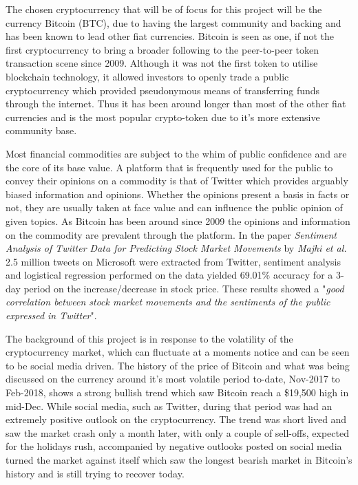 \documentclass[oneside, 12pt]{article}
\begin{document}
	The chosen cryptocurrency that will be of focus for this project will be the currency Bitcoin (BTC), due to having the largest community and backing and has been known to lead other fiat currencies. Bitcoin is seen as one, if not the first cryptocurrency to bring a broader following to the peer-to-peer token transaction scene since 2009. Although it was not the first token to utilise blockchain technology, it allowed investors to openly trade a public cryptocurrency which provided pseudonymous means of transferring funds through the internet. Thus it has been around longer than most of the other fiat currencies and is the most popular crypto-token due to it's more extensive community base.
	
	Most financial commodities are subject to the whim of public confidence and are the core of its base value. A platform that is frequently used for the public to convey their opinions on a commodity is that of Twitter which provides arguably biased information and opinions. Whether the opinions present a basis in facts or not, they are usually taken at face value and can influence the public opinion of given topics. As Bitcoin has been around since 2009 the opinions and information on the commodity are prevalent through the platform. 
	In the paper \textit{Sentiment Analysis of Twitter Data for Predicting Stock Market Movements} by \textit{Majhi et al.} \cite{SaTdpsmm} 2.5 million tweets on Microsoft were extracted from Twitter, sentiment analysis and logistical regression performed on the data yielded 69.01\% accuracy for a 3-day period on the increase/decrease in stock price. These results showed a "\textit{good correlation between stock market movements and the sentiments of the public expressed in Twitter}".
	
	The background of this project is in response to the volatility of the cryptocurrency market, which can fluctuate at a moments notice and can be seen to be social media driven. The history of the price of Bitcoin and what was being discussed on the currency around it's most volatile period to-date, Nov-2017 to Feb-2018, shows a strong bullish trend which saw Bitcoin reach a \$19,500 high in mid-Dec. While social media, such as Twitter, during that period was had an extremely positive outlook on the cryptocurrency. The trend was short lived and saw the market crash only a month later, with only a couple of sell-offs, expected for the holidays rush, accompanied by negative outlooks posted on social media turned the market against itself which saw the longest bearish market in Bitcoin's history and is still trying to recover today.
	
\end{document}
